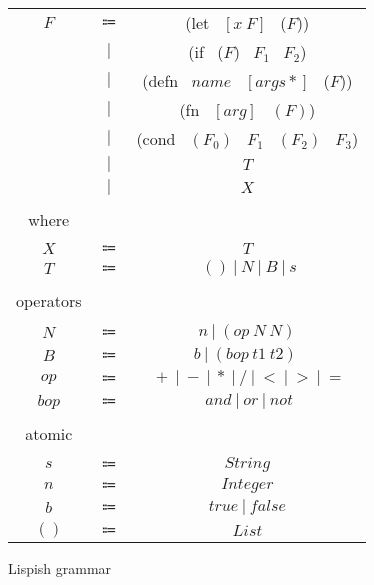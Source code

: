 \begin{figure}[ht]
\centering
\begin{tabular}{ c c c }
$F$ & $\Coloneqq$ & (let \ $[x \ F]$ \ ($F$)) \\
 & $|$ & (if \ ($F$) \ $F_1$ \ $F_2$) \\
 & $|$ & (defn \ $name$ \ $[args*]$ \ ($F$)) \\
 & $|$ & (fn \ $[arg]$ \ $(F)$) \\
 & $|$ & (cond \ $(F_0)$ \ $F_1$ \ $(F_2)$ \ $F_3$) \\
 & $|$ & $T$ \\
 & $|$ & $X$ \\
 & & \\
where & & \\
 & & \\
$X$ & $\Coloneqq$ & $T$ \\
$T$ & $\Coloneqq$ & $ \ () \ \vert \ N \ \vert \ B \ \vert \ s $ \\
& & \\
operators & & \\
 & & \\
$N$ & $\Coloneqq$ & $ n \ \vert \ (op \ N \ N) $ \\
$B$ & $\Coloneqq$ & $ b \ \vert \ (bop \ t1 \ t2) \ $ \\
$op$ & $\Coloneqq$ & $ \ + \ \vert \ - \ \vert \ * \ \vert \ / \ \vert \ < \ \vert \ > \ \vert \ =$\\
$bop$ & $\Coloneqq$ & $ \ and \ \vert \ or \ \vert \ not$ \\
& & \\
atomic & & \\
 & & \\
$s$ & $\Coloneqq$ & $ String $ \\
$n$ & $\Coloneqq$ & $ Integer $ \\
$b$ & $\Coloneqq$ & $ true \ \vert \ false $ \\
$()$ & $\Coloneqq$ & $ List $ \\
\end{tabular}

\caption{Lispish grammar}
\label{fig:lispish-grammar}
\end{figure}